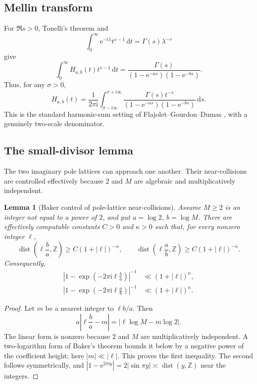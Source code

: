 \documentclass[11pt,oneside]{article}
\newtheorem{lemma}[theorem]{Lemma}
\theoremstyle{definition}
\theoremstyle{remark}
\newcommand{\Z}{\mathbb Z}
\newcommand{\dist}{\operatorname{dist}}
\newcommand{\e}{\mathrm e}
\newcommand{\ii}{\mathrm i}
\newcommand{\dd}{\,\mathrm d}
\begin{document}
\subsection{Mellin transform}

For $\Re s>0$, Tonelli's theorem and
\[
  \int_0^\infty \e^{-t\lambda}t^{s-1}\dd t
  =\Gamma(s)\lambda^{-s}
\]
give
\begin{equation}
  \int_0^\infty H_{a,b}(t)t^{s-1}\dd t
  =\frac{\Gamma(s)}{(1-\e^{-as})(1-\e^{-bs})}.
  \label{eq:heat-mellin}
\end{equation}
Thus, for any $\sigma>0$,
\begin{equation}
  H_{a,b}(t)=\frac1{2\pi\ii}
   \int_{\sigma-\ii\infty}^{\sigma+\ii\infty}
   \frac{\Gamma(s)t^{-s}}
        {(1-\e^{-as})(1-\e^{-bs})}\dd s.
  \label{eq:mellin-inversion}
\end{equation}
This is the standard harmonic-sum setting of Flajolet--Gourdon--Dumas \cite{FlajoletGourdonDumas1995}, with a genuinely two-scale denominator.

\subsection{The small-divisor lemma}

The two imaginary pole lattices can approach one another.  Their near-collisions are controlled effectively because $2$ and $M$ are algebraic and multiplicatively independent.

\begin{lemma}[Baker control of pole-lattice near-collisions]
\label{lem:small-divisor}
Assume $M\ge2$ is an integer not equal to a power of $2$, and put $a=\log2$, $b=\log M$.  There are effectively computable constants $C>0$ and $\kappa>0$ such that, for every nonzero integer $\ell$,
\begin{equation}
 \dist\!\left(\ell\frac ba,\Z\right)
   \ge C(1+|\ell|)^{-\kappa},
 \qquad
 \dist\!\left(\ell\frac ab,\Z\right)
   \ge C(1+|\ell|)^{-\kappa}.
 \label{eq:small-divisor}
\end{equation}
Consequently,
\begin{align}
 \left|1-\exp\!\left(-2\pi\ii\ell\frac ba\right)\right|^{-1}
   &\ll (1+|\ell|)^\kappa,\label{eq:denom-a}\\
 \left|1-\exp\!\left(-2\pi\ii\ell\frac ab\right)\right|^{-1}
   &\ll (1+|\ell|)^\kappa.\label{eq:denom-b}
\end{align}
\end{lemma}

\begin{proof}
Let $m$ be a nearest integer to $\ell b/a$.  Then
\[
 a\left|\ell\frac ba-m\right|
   =|\ell\log M-m\log2|.
\]
The linear form is nonzero because $2$ and $M$ are multiplicatively independent.  A two-logarithm form of Baker's theorem \cite{Baker1975,BakerWustholz1993} bounds it below by a negative power of the coefficient height; here $|m|\ll|\ell|$.  This proves the first inequality.  The second follows symmetrically, and $|1-\e^{2\pi\ii y}|=2|\sin\pi y|\asymp\dist(y,\Z)$ near the integers.
\end{proof}
\end{document}

